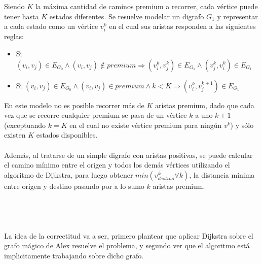 Siendo $K$ la máxima cantidad de caminos premium a recorrer, cada vértice puede tener hasta $K$ estados diferentes. Se resuelve modelar un digrafo $G_1$ y representar a cada estado como un vértice $v_i^k$ en el cual sus aristas responden a las siguientes reglas:
\begin{itemize}
	\item Si $(v_i,v_j) \in E_{G_0} \land (v_i,v_j) \notin premium \Rightarrow (v_i^k,v_j^k) \in E_{G_1} \land (v_j^k,v_i^k) \in E_{G_1}$
	\item Si $(v_i,v_j) \in E_{G_0} \land (v_i,v_j) \in premium \land k < K \Rightarrow (v_i^k,v_j^{k+1}) \in E_{G_1}$
\end{itemize}
En este modelo no es posible recorrer más de $K$ aristas premium, dado que cada vez que se recorre cualquier premium se pasa de un vértice $k$ a uno $k+1$ (exceptuando $k=K$ en el cual no existe vértice premium para ningún $v^k$) y sólo existen $K$ estados disponibles.\\\\
Además, al tratarse de un simple digrafo con aristas positivas, se puede calcular el camino mínimo entre el origen y todos los demás vértices utilizando el algoritmo de Dijkstra, para luego obtener $min(v_{destino}^k \forall k)$, la distancia mínima entre origen y destino pasando por a lo sumo $k$ aristas premium.\\\\\\\\\\



La idea de la correctitud va a ser, primero plantear que aplicar Dijkstra sobre el grafo mágico de Alex resuelve el problema, y segundo ver que el algoritmo está implicitamente trabajando sobre dicho grafo.

